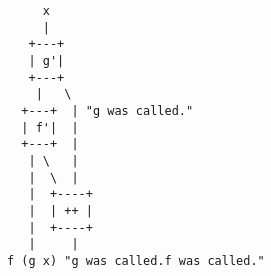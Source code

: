 \begin{center}
\begin{BVerbatim}
     x
     |
   +---+
   | g'|
   +---+
    |   \   
  +---+  | "g was called."
  | f'|  |
  +---+  |
   | \   |
   |  \  |
   |  +----+
   |  | ++ |
   |  +----+
   |     |
f (g x) "g was called.f was called."
\end{BVerbatim}
\end{center}

